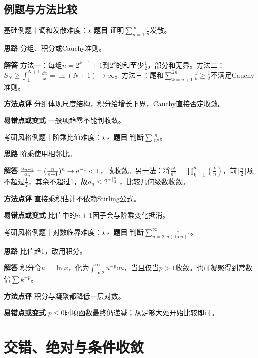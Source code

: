 \subsection{例题与方法比较}
\begin{example}{基础例题｜调和发散}{难度：$\star$}
\label{ex:9:1}\textbf{题目} 证明$\sum_{n=1}^{\infty}\frac{1}{n}$发散。\par
\textbf{思路} 分组、积分或Cauchy准则。\par
\textbf{解答} 方法一：每组$n=2^{k-1}+1$到$2^k$的和至少$\frac{1}{2}$，部分和无界。方法二：$S_N\ge\int_1^{N+1}\frac{\dd x}{x}=\ln(N+1)\to\infty$。方法三：尾和$\sum_{k=n+1}^{2n}\frac{1}{k}\ge\frac{1}{2}$不满足Cauchy准则。\par
\textbf{方法点评} 分组体现尺度结构，积分给增长下界，Cauchy直接否定收敛。\par
\textbf{易错点或变式} 一般项趋零不能判收敛。
\end{example}
\begin{example}{考研风格例题｜阶乘比值}{难度：$\star\star$}
\label{ex:9:2}\textbf{题目} 判断$\sum \frac{n!}{n^n}$。\par
\textbf{思路} 阶乘使用相邻比。\par
\textbf{解答} $\frac{a_{n+1}}{a_n}=(\frac{n}{n+1})^n\to\mathrm{e}^{-1}<1$，故收敛。另一法：将$\frac{n!}{n^n}=\prod_{k=1}^n(\frac{k}{n})$，前$\lfloor \frac{n}{2}\rfloor$项不超过$\frac{1}{2}$，其余不超过1，故$a_n\le2^{-\lfloor \frac{n}{2}\rfloor}$，比较几何级数收敛。\par
\textbf{方法点评} 直接乘积估计不依赖Stirling公式。\par
\textbf{易错点或变式} 比值中的$n+1$因子会与阶乘变化抵消。
\end{example}
\begin{example}{考研风格例题｜对数临界}{难度：$\star\star$}
\label{ex:9:3}\textbf{题目} 判断$\sum_{n=2}^{\infty}\frac{1}{n(\ln n)^p}$。\par
\textbf{思路} 比值趋1，改用积分。\par
\textbf{解答} 积分令$u=\ln x$，化为$\int_{\ln2}^{\infty}u^{-p}\dd u$，当且仅当$p>1$收敛。也可凝聚得到常数倍$\sum k^{-p}$。\par
\textbf{方法点评} 积分与凝聚都降低一层对数。\par
\textbf{易错点或变式} $p\le0$时项函数最终仍递减；从足够大处开始比较即可。
\end{example}
\section{交错、绝对与条件收敛}\label{sec:9:2}


